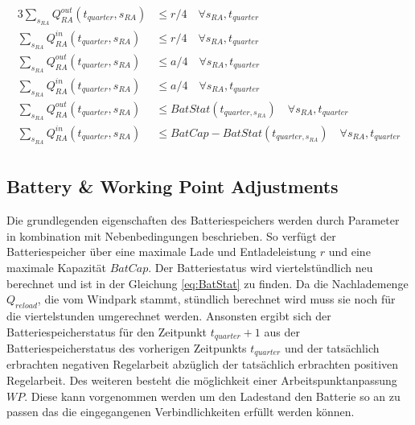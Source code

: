 \begin{alignat}{3}
	\sum_{s_{RA}} Q^{out}_{RA}(t_{quarter}, s_{RA}) & \leq r/4 \quad \forall s_{RA}, t_{quarter} \label{eq:RA_Q_out_r}                                    \\
	\sum_{s_{RA}} Q^{in}_{RA}(t_{quarter}, s_{RA})  & \leq r/4 \quad \forall s_{RA}, t_{quarter} \label{eq:RA_Q_in_r}                                     \\
	\sum_{s_{RA}} Q^{out}_{RA}(t_{quarter}, s_{RA}) & \leq a/4 \quad \forall s_{RA}, t_{quarter} \label{eq:RA_Q_out_a}                                    \\
	\sum_{s_{RA}} Q^{in}_{RA}(t_{quarter}, s_{RA})  & \leq a/4 \quad \forall s_{RA}, t_{quarter} \label{eq:RA_Q_in_a}                                     \\
	\sum_{s_{RA}} Q^{out}_{RA}(t_{quarter}, s_{RA}) & \leq BatStat(t_{quarter, s_{RA}}) \quad \forall s_{RA}, t_{quarter} \label{eq:RA_Q_out_Bat}         \\
	\sum_{s_{RA}} Q^{in}_{RA}(t_{quarter}, s_{RA})  & \leq BatCap - BatStat(t_{quarter, s_{RA}}) \quad \forall s_{RA}, t_{quarter} \label{eq:RA_Q_in_Bat} \\
\end{alignat}



\subsection{Battery \& Working Point Adjustments}
Die grundlegenden eigenschaften des Batteriespeichers werden durch Parameter in kombination mit Nebenbedingungen beschrieben.
So verfügt der Batteriespeicher über eine maximale Lade und Entladeleistung $r$ und eine maximale Kapazität $BatCap$.
Der Batteriestatus wird viertelstündlich neu berechnet und ist in der Gleichung \ref{eq:BatStat} zu finden.
Da die Nachlademenge $Q_{reload}$, die vom Windpark stammt, stündlich berechnet wird muss sie noch für die viertelstunden umgerechnet werden.
Ansonsten ergibt sich der Batteriespeicherstatus für den Zeitpunkt $t_{quarter} + 1$ aus der Batteriespeicherstatus des vorherigen Zeitpunkts $t_{quarter}$ und der
tatsächlich erbrachten negativen Regelarbeit abzüglich der tatsächlich erbrachten positiven Regelarbeit.
Des weiteren besteht die möglichkeit einer Arbeitspunktanpassung $WP$. Diese kann vorgenommen werden um den Ladestand den Batterie so an zu
passen das die eingegangenen Verbindlichkeiten erfüllt werden können.


